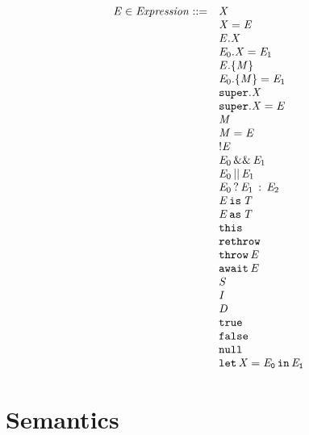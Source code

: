 \documentclass{article}
\begin{document}
\[
\begin{array}{rl}
  \mathit{E} \in \mathit{Expression} ::=
  & \mathit{X} \\
  & \mathit{X}=\mathit{E} \\
  & \mathit{E}.\mathit{X} \\
  & \mathit{E}_0.\mathit{X}=\mathit{E}_1 \\
  & \mathit{E}.\{\mathit{M}\} \\
  & \mathit{E}_0.\{\mathit{M}\}=\mathit{E}_1 \\
  & \tt{super}.\mathit{X} \\
  & \tt{super}.\mathit{X}=\mathit{E} \\
  & \mathit{M} \\
  & \mathit{M}=\mathit{E} \\
  & !\mathit{E} \\
  & \mathit{E}_0\,\&\&\,\mathit{E}_1 \\
  & \mathit{E}_0\,||\,\mathit{E}_1 \\
  & \mathit{E}_0\,?\,\mathit{E}_1\,:\,\mathit{E}_2 \\
  & \mathit{E}\,\tt{is}\,\mathit{T} \\
  & \mathit{E}\,\tt{as}\,\mathit{T} \\
  & \tt{this} \\
  & \tt{rethrow} \\
  & \tt{throw}\,\mathit{E} \\
  & \tt{await\,\ensuremath{\mathit{E}}} \\
  & \mathit{S} \\
  & \mathit{I} \\
  & \mathit{D} \\
  & \tt{true} \\
  & \tt{false} \\
  & \tt{null} \\
  & \tt{let}\,\mathit{X}=\mathit{E}_0\,\tt{in}\,\mathit{E}_1 \\
\end{array}  
\]


\section{Semantics}
\label{sec:semantics}
\end{document}

